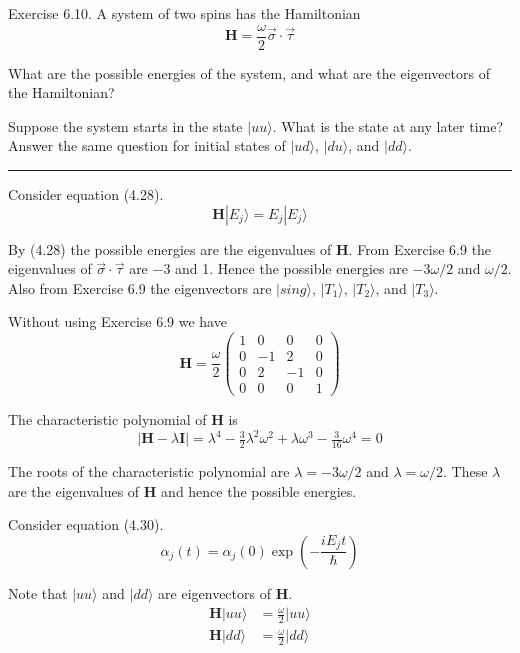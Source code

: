 \documentclass[12pt]{article}
\begin{document}
Exercise 6.10.
A system of two spins has the Hamiltonian
\begin{equation*}
\mathbf H=\frac{\omega}{2}\vec\sigma\cdot\vec\tau
\end{equation*}

What are the possible energies of the system, and what are the
eigenvectors of the Hamiltonian?

\bigskip
Suppose the system starts in the state $|uu\rangle$.
What is the state at any later time?
Answer the same question for initial states of
$|ud\rangle$, $|du\rangle$, and $|dd\rangle$.

\bigskip
\hrule

\bigskip
Consider equation (4.28).
\begin{equation*}
\mathbf H|E_j\rangle=E_j|E_j\rangle
\tag{4.28}
\end{equation*}

By (4.28) the possible energies are the eigenvalues of $\mathbf H$.
From Exercise 6.9 the eigenvalues of $\vec\sigma\cdot\vec\tau$ are $-3$ and 1.
Hence the possible energies are $-3\omega/2$ and $\omega/2$.
Also from Exercise 6.9 the eigenvectors are
$|sing\rangle$, $|T_1\rangle$, $|T_2\rangle$, and $|T_3\rangle$.

\bigskip
Without using Exercise 6.9 we have
\begin{equation*}
\mathbf H=\frac{\omega}{2}
\begin{pmatrix}
1&0&0&0
\\
0&-1&2&0
\\
0&2&-1&0
\\
0&0&0&1
\end{pmatrix}
\end{equation*}

The characteristic polynomial of $\mathbf H$ is
\begin{equation*}
|\mathbf H-\lambda\mathbf I|
=\lambda^4-\tfrac{3}{2}\lambda^2\omega^2+\lambda\omega^3-\tfrac{3}{16}\omega^4=0
\end{equation*}

The roots of the characteristic polynomial are $\lambda=-3\omega/2$ and $\lambda=\omega/2$.
These $\lambda$ are the eigenvalues of $\mathbf H$ and hence the possible energies.

\bigskip
Consider equation (4.30).
\begin{equation*}
\alpha_j(t)=\alpha_j(0)\exp\left(-\frac{iE_jt}{\hbar}\right)
\tag{4.30}
\end{equation*}

Note that $|uu\rangle$ and $|dd\rangle$ are eigenvectors of $\mathbf H$.
\begin{align*}
\mathbf H|uu\rangle&=\frac{\omega}{2}|uu\rangle
\\[1ex]
\mathbf H|dd\rangle&=\frac{\omega}{2}|dd\rangle
\end{align*}
\end{document}
